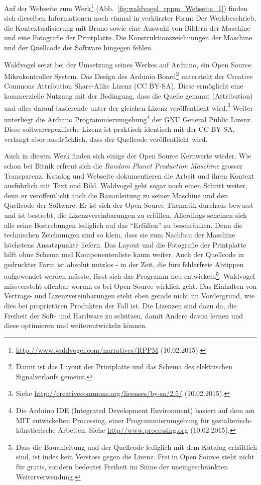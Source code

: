 \documentclass[
paper=164mm:234mm, %
pagesize, %
DIV=calc, %
10pt, %
parskip=half- %
]{scrbook}
\begin{document}
Auf der Webseite zum Werk\footnote{\url{http://www.waldvogel.com/narratives/RPPM} (10.02.2015).} (Abb.~\ref{fig:waldvogel_rppm_Webseite_1}) finden sich dieselben Informationen noch einmal in verkürzter Form: Der Werkbeschrieb, die Kontextualisierung mit Bruno sowie eine Auswahl von Bildern der Maschine und eine Fotografie der Printplatte. Die Konstruktionszeichnungen der Maschine und der Quellcode der Software hingegen fehlen.

Waldvogel setzt bei der Umsetzung seines Werkes auf Arduino, ein Open Source Mikrokontroller System. Das Design des Ardunio Board\footnote{Damit ist das Layout der Printplatte und das Schema des elektrischen Signalverlaufs gemeint.} untersteht der Creative Commons Attribution Share-Alike Lizenz (CC BY-SA). Diese ermöglicht eine kommerzielle Nutzung mit der Bedingung, dass die Quelle genannt (Attribution) und alles darauf basierende unter der gleichen Lizenz veröffentlicht wird.\footnote{Siehe \url{http://creativecommons.org/licenses/by-sa/2.5/} (10.02.2015).} Weiter unterliegt die Arduino Programmierumgebung\footnote{Die Arduino IDE (Integrated Development Environment) basiert auf dem am MIT entwickelten Processing, einer Programmierumgebung für gestalterisch-künstlerische Arbeiten. Siehe \url{http//www.processing.org} (10.02.2015).} der GNU General Public Lizenz. Diese softwarespezifische Lizenz ist praktisch identisch mit der CC BY-SA, verlangt aber ausdrücklich, dass der Quellcode veröffentlicht wird.

Auch in diesem Werk finden sich einige der Open Source Kernwerte wieder. Wie schon bei Bitnik erfreut sich die \emph{Random Planet Production Maschine} grosser Transparenz. Katalog und Webseite dokumentieren die Arbeit und ihren Kontext ausführlich mit Text und Bild. Waldvogel geht sogar noch einen Schritt weiter, denn er veröffentlicht auch die Bauanleitung zu seiner Maschine und den Quellcode der Software. Er ist sich der Open Source Thematik durchaus bewusst und ist bestrebt, die Lizenzvereinbarungen zu erfüllen. Allerdings scheinen sich alle seine Bestrebungen lediglich auf das \enquote{Erfüllen} zu beschränken. Denn die technischen Zeichnungen sind so klein, dass sie zum Nachbau der Maschine höchstens Ansatzpunkte liefern. Das Layout und die Fotografie der Printplatte hilft ohne Schema und Komponentenliste kaum weiter. Auch der Quellcode in gedruckter Form ist absolut nutzlos - in der Zeit, die fürs fehlerfreie Abtippen aufgewendet werden müsste, lässt sich das Programm neu entwickeln\footnote{Dass die Bauanleitung und der Quellcode lediglich mit dem Katalog erhältlich sind, ist indes kein Verstoss gegen die Lizenz. Frei in Open Source steht nicht für gratis, sondern bedeutet Freiheit im Sinne der uneingeschränkten Weiterverwendung.}. Waldvogel missversteht offenbar worum es bei Open Source wirklich geht. Das Einhalten von Vertrags- und Lizenzvereinbarungen steht eben gerade nicht im Vordergrund, wie dies bei proprietären Produkten der Fall ist. Die Lizenzen sind dazu da, die Freiheit der Soft- und Hardware zu schützen, damit Andere davon lernen und diese optimieren und weiterentwickeln können.
\end{document}
